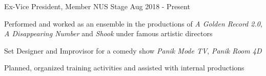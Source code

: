 

\begin{cventries}

  \cventry
    {Ex-Vice President, Member} %
    {NUS Stage} %
    {} %
    {Aug 2018 - Present} %
    {
      \begin{cvitems} %
        \item {Performed and worked as an ensemble in the productions of \textit{A Golden Record 2.0}, \textit{A Disappearing Number} and \textit{Shook} under famous artistic directors}
        \item {Set Designer and Improvisor for a comedy show \textit{Panik Mode TV}, \textit{Panik Room 4D}}
        \item {Planned, organized training activities and assisted with internal productions}
      \end{cvitems}
    }


\end{cventries}
